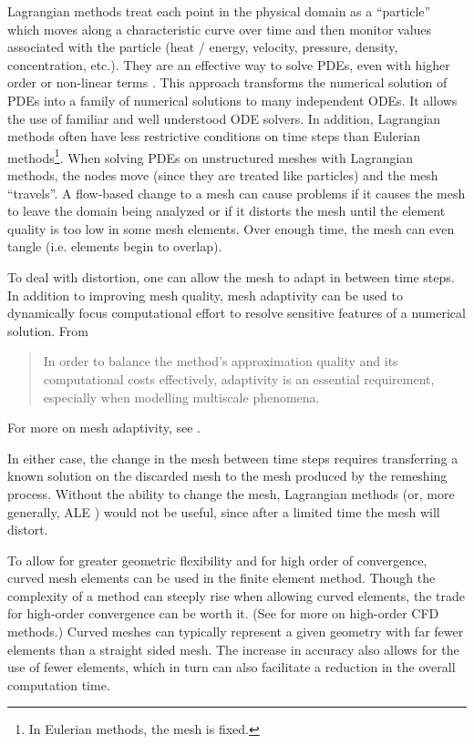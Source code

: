 \documentclass[oneside, reqno]{amsart}
\theoremstyle{definition}
\begin{document}
Lagrangian methods treat each point in the
physical domain as a ``particle'' which moves along a characteristic curve
over time and then monitor values associated with the particle (heat / energy,
velocity, pressure, density, concentration, etc.). They are an effective way
to solve PDEs, even with higher order or non-linear terms \cite{MR3023731}.
This approach transforms the numerical solution of PDEs into a family of
numerical solutions to many independent ODEs. It allows the use of familiar
and well understood ODE solvers. In addition, Lagrangian methods often
have less restrictive conditions on time steps than Eulerian
methods\footnote{In Eulerian methods, the mesh is fixed.}.
When solving PDEs on unstructured meshes
with Lagrangian methods, the nodes move (since they
are treated like particles) and the mesh ``travels''.
A flow-based change to a mesh can cause problems if it causes the mesh to
leave the domain being analyzed or if it distorts the mesh until the element
quality is too low in some mesh elements. Over enough time, the mesh can
even tangle (i.e. elements begin to overlap).

To deal with distortion, one can allow the mesh to adapt in between time
steps. In addition to improving mesh quality, mesh
adaptivity can be used to dynamically focus computational effort to resolve
sensitive features of a numerical solution. From \cite{Iske2004}
\begin{quote}
{\small In order to balance the method's approximation quality and its
computational costs effectively, adaptivity is an essential requirement,
especially when modelling multiscale phenomena.}
\end{quote}
For more on mesh adaptivity, see \cite{Babuska1978, Peraire1987, Pain2001}.

In either case, the change in the
mesh between time steps requires transferring a known solution on the
discarded mesh to the mesh produced by the remeshing process. Without
the ability to change the mesh, Lagrangian methods (or, more generally,
ALE \cite{Hirt1974}) would not be useful, since after a limited time the
mesh will distort.

To allow for greater geometric flexibility and for high order of convergence,
curved mesh elements can be used in the finite element method. Though the
complexity of a method can steeply rise when allowing curved elements, the
trade for high-order convergence can be worth it. (See \cite{Wang2013} for
more on high-order CFD methods.) Curved meshes can typically
represent a given geometry with far fewer elements than a straight sided mesh.
The increase in accuracy also allows for the use of fewer elements, which
in turn can also facilitate a reduction in the overall computation time.
\end{document}
